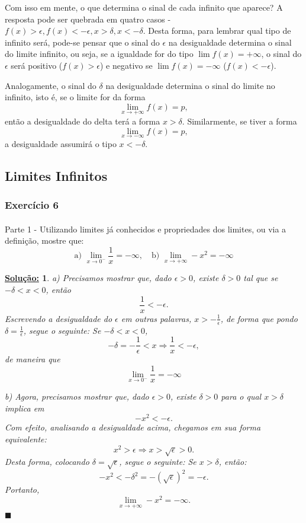 \documentclass{article}
\newtheorem*{sol*}{\underline{Solu\c c\~ao:}}
\renewcommand\qedsymbol{$\blacksquare$}
\begin{document}
Com isso em mente, o que determina o sinal de cada infinito que aparece? A resposta pode ser quebrada em quatro casos - $f(x) > \epsilon, f(x) < -\epsilon, x > \delta, x < -\delta$. Desta forma, para lembrar qual tipo de infinito ser\'a, pode-se pensar que o sinal do $\epsilon$ na desigualdade determina o sinal do limite infinito, ou seja, se a igualdade for do tipo $\lim f(x) = +\infty$, o sinal do $\epsilon$ ser\'a positivo ($f(x) > \epsilon$) e negativo se $\lim f(x) = -\infty$ ($f(x) < -\epsilon$). 

Analogamente, o sinal do $\delta$ na desigualdade determina o sinal do limite no infinito, isto \'e, se o limite for da forma 
$$
\lim_{x\to+\infty} f(x) = p,
$$
ent\~ao a desigualdade do delta ter\'a a forma $x > \delta$. Similarmente, se tiver a forma 
$$
\lim_{x\to-\infty} f(x) = p,
$$
a desigualdade assumir\'a o tipo $x < -\delta.$

\subsection{Limites Infinitos}
\subsubsection{Exerc\'icio 6} 
\paragraph{}Parte 1 - Utilizando limites j\'a conhecidos e propriedades dos limites, ou via a defini\c c\~ao, mostre que:
$$
\text{a) }\lim_{x\to{0^{-}}}{\frac{1}{x}} = -\infty, \quad \text{b) }\lim_{x\to+\infty} -x^2 = -\infty
$$
\begin{sol*}
a) Precisamos mostrar que, dado $\epsilon > 0$, existe $\delta > 0$ tal que se $-\delta < x < 0$, ent\~ao 
$$
\frac{1}{x} < -\epsilon.
$$
Escrevendo a desigualdade do $\epsilon$ em outras palavras, $x > -\frac{1}{\epsilon}$, de forma que pondo $\delta = \frac{1}{\epsilon}$, segue o seguinte: Se $-\delta < x < 0$,  
$$
-\delta  = -\frac{1}{\epsilon} < x \Rightarrow \frac{1}{x} < -\epsilon,
$$
de maneira que 
$$
\lim_{x\to{0^{-}}}{\frac{1}{x}} = -\infty
$$

b) Agora, precisamos mostrar que, dado $\epsilon > 0$, existe $\delta > 0$ para o qual $x > \delta$ implica em
$$
-x^2 < -\epsilon.
$$
Com efeito, analisando a desigualdade acima, chegamos em sua forma equivalente:
$$
x^2 > \epsilon\Rightarrow x > \sqrt{\epsilon} > 0.
$$
Desta forma, colocando $\delta = \sqrt{\epsilon}$, segue o seguinte: Se $x > \delta$, ent\~ao:
$$
-x^2 < -\delta^2 = -(\sqrt{\epsilon})^2 = -\epsilon.
$$
Portanto, 
$$
\lim_{x\to+\infty} -x^2 = -\infty.
$$
\qedsymbol
\end{sol*}
\end{document}
